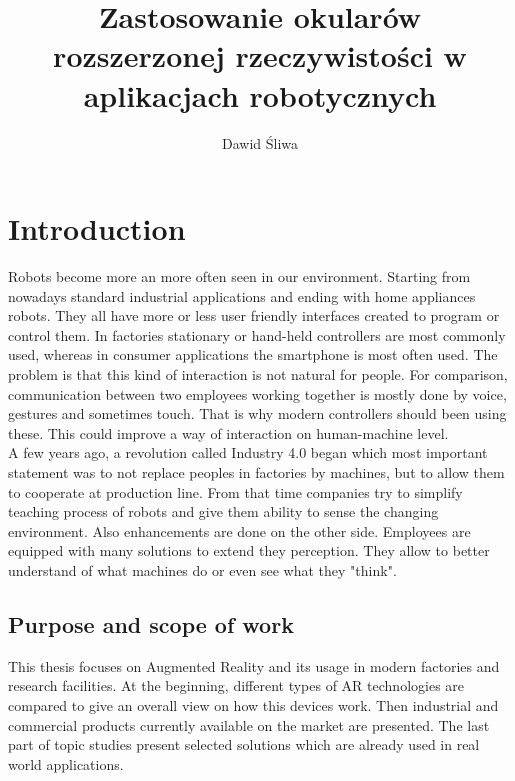 \documentclass[printmode,en]{mgr}
\title{Zastosowanie okularów rozszerzonej rzeczywistości w aplikacjach
robotycznych}
\author{Dawid Śliwa}
\begin{document}

\maketitle %


\tableofcontents %

\chapter{Introduction}
Robots become more an more often seen in our environment. Starting from nowadays standard industrial applications and ending with home appliances robots. They all have more or less user friendly interfaces created to program or control them. In factories stationary or hand-held controllers are most commonly used, whereas in consumer applications the smartphone is most often used. The problem is that this kind of interaction is not natural for people. For comparison, communication between two employees working together is mostly done by voice, gestures and sometimes touch. That is why modern controllers should been using these. This could improve a way of interaction on human-machine level.\\

A few years ago, a revolution called Industry 4.0 began which most important statement was to not replace peoples in factories by machines, but to allow them to cooperate at production line. From that time companies try to simplify teaching process of robots and give them ability to sense the changing environment. Also enhancements are done on the other side. Employees are equipped with many solutions to extend they perception. They allow to better understand of what machines do or even see what they "think".

\section{Purpose and scope of work}
This thesis focuses on Augmented Reality and its usage in modern factories and research facilities. At the beginning, different types of AR technologies are compared to give an overall view on how this devices work. Then industrial and commercial products currently available on the market are presented. The last part of topic studies present selected solutions which are already used in real world applications.\\
\end{document}
